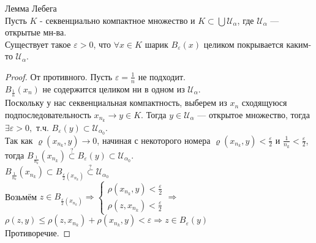 \begin{lemma}
    Лемма Лебега \\
    Пусть $K$ - секвенциально компактное множество
    и $K \subset \bigcup \mathcal{U_{\alpha}}$, где $\mathcal{U_{\alpha}}$ --- открытые мн-ва. \\
    Существует такое $\varepsilon > 0$, что $\forall x \in K$ шарик $B_{\varepsilon}(x)$ целиком покрывается каким-то $\mathcal{U_{\alpha}}$.
    \begin{proof}
        От противного. Пусть $\varepsilon = \frac{1}{n}$ не подходит. \\
         $B_{\frac{1}{n}}(x_n)$ не содержится целиком ни в одном из $\mathcal{U_{\alpha}}$.  \\
         Поскольку у нас секвенциальная компактность, выберем из $x_n$ сходящуюся подпоследовательность $x_{n_k} \rightarrow y \in K$.
         Тогда $y \in \mathcal{U_{\alpha}}$ --- открытое множество, тогда $\exists \varepsilon > 0,$ т.ч. $B_{\varepsilon}(y) \subset \mathcal{U_{\alpha_0}}$. \\
         Так как $\varrho(x_{n_k},y)\rightarrow 0$, начиная с некоторого номера $\varrho(x_{n_k},y) < \frac{\varepsilon}{2}$ и $\frac{1}{n_k} < \frac{\varepsilon}{2}$, \\
         тогда $B_{\frac{1}{n_k}}(x_{n_k}) \stackrel{?}{\subset} B_{\varepsilon}(y) \subset \mathcal{U_{\alpha_0}}$. \\
         $B_{\frac{1}{n_k}}(x_{n_k}) \subset B_{\frac{\varepsilon}{2}(x_{n_k})} \stackrel{?}{\subset} \mathcal{U_{\alpha_0}}$ \\
         Возьмём $z \in B_{\frac{\varepsilon}{2}(x_{n_k})} \Longrightarrow 
         \begin{cases}
             \rho(x_{n_k},y) < \frac{\varepsilon}{2} \\
             \rho(z,x_{n_k}) < \frac{\varepsilon}{2}
         \end{cases} \Longrightarrow$ 
        $\rho(z,y) \leqslant \rho (z, x_{n_k}) + \rho (x_{n_k},y) < \varepsilon \Longrightarrow z \in B_{\varepsilon}(y)$ \\
        Противоречие.
    \end{proof}
\end{lemma}

